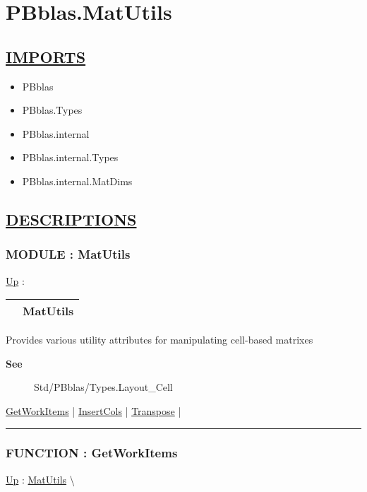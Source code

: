 \chapter*{PBblas.MatUtils}
\hypertarget{ecldoc:toc:PBblas.MatUtils}{}

\section*{\underline{IMPORTS}}
\begin{itemize}
\item PBblas
\item PBblas.Types
\item PBblas.internal
\item PBblas.internal.Types
\item PBblas.internal.MatDims
\end{itemize}

\section*{\underline{DESCRIPTIONS}}
\subsection*{MODULE : MatUtils}
\hypertarget{ecldoc:PBblas.MatUtils}{}
\hyperlink{ecldoc:toc:PBblas}{Up} :

{\renewcommand{\arraystretch}{1.5}
\begin{tabularx}{\textwidth}{|>{\raggedright\arraybackslash}l|X|}
\hline
\hspace{0pt} & MatUtils \\
\hline
\end{tabularx}
}

\par
Provides various utility attributes for manipulating cell-based matrixes

\par
\begin{description}
\item [\textbf{See}] Std/PBblas/Types.Layout\_Cell
\end{description}

\hyperlink{ecldoc:pbblas.matutils.getworkitems}{GetWorkItems}  |
\hyperlink{ecldoc:pbblas.matutils.insertcols}{InsertCols}  |
\hyperlink{ecldoc:pbblas.matutils.transpose}{Transpose}  |

\rule{\linewidth}{0.5pt}

\subsection*{FUNCTION : GetWorkItems}
\hypertarget{ecldoc:pbblas.matutils.getworkitems}{}
\hyperlink{ecldoc:PBblas.MatUtils}{Up} :
\hspace{0pt} \hyperlink{ecldoc:PBblas.MatUtils}{MatUtils} \textbackslash 


